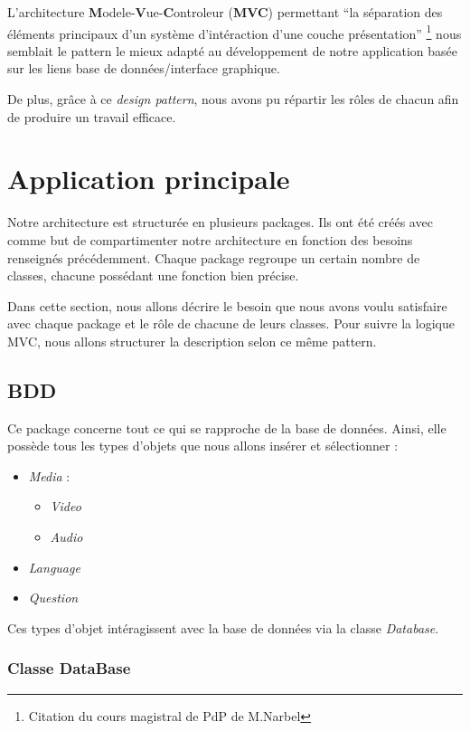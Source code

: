 L'architecture \textbf{M}odele-\textbf{V}ue-\textbf{C}ontroleur (\textbf{MVC}) permettant ``la séparation des éléments principaux d'un système d'intéraction d'une couche présentation'' \footnote{Citation du cours magistral de PdP de M.Narbel} nous semblait le pattern le mieux adapté au développement de notre application basée sur les liens base de données/interface graphique. 

De plus, grâce à ce \textit{design pattern}, nous avons pu répartir les rôles de chacun afin de produire un travail efficace.

\section{Application principale}

Notre architecture est structurée en plusieurs packages. Ils ont été créés avec comme but de compartimenter notre architecture en fonction des besoins renseignés précédemment. Chaque package regroupe un certain nombre de classes, chacune possédant une fonction bien précise.

Dans cette section, nous allons décrire le besoin que nous avons voulu satisfaire avec chaque package et le rôle de chacune de leurs classes. Pour suivre la logique MVC, nous allons structurer la description selon ce même pattern.


\subsection{BDD}

Ce package concerne tout ce qui se rapproche de la base de données. Ainsi, elle possède tous les types d'objets que nous allons insérer et sélectionner :
\begin{itemize}
 \item \textit{Media} :
 \begin{itemize}
  \item \textit{Video}
  \item \textit{Audio}
 \end{itemize}
 \item \textit{Language}
 \item \textit{Question}
\end{itemize}
Ces types d'objet intéragissent avec la base de données via la classe \textit{Database}.


\subsubsection{Classe DataBase}

